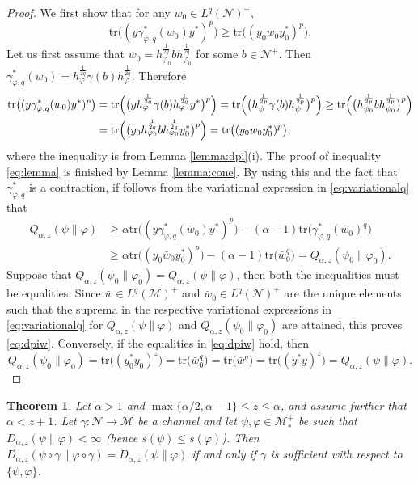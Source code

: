 \documentclass[12pt]{article}
\newtheorem{theorem}{Theorem}[section]
\theoremstyle{definition}
\theoremstyle{remark}
\numberwithin{equation}{section}
\def\Me{\mathcal M}
\def\Ne{\mathcal N}
\def\Tr{\mathrm{tr}}
\def\ffi{\varphi}
\begin{document}
\begin{proof} We first show that  for any $w_0\in L^q(\Ne)^+$,
\begin{equation}\label{eq:lemma}
\Tr\bigl((y\gamma^*_{\ffi,q}(w_0)y^*)^p\bigr)\ge
\Tr\bigl((y_0w_0y_0^*)^p\bigr).
\end{equation}
Let us first assume that
$w_0=h_{\varphi_0}^{\frac1{2q}}bh_{\varphi_0}^{\frac1{2q}}$ for some $b\in \Ne^+$. Then 
$\gamma^*_{\varphi,q}(w_0)=h_{\varphi}^{\frac1{2q}}\gamma(b)h_{\varphi}^{\frac1{2q}}$.
Therefore
\begin{align*}
\Tr\bigl((y\gamma^*_{\varphi,q}(w_0)y^*)^p\bigr)
&=\Tr\Bigl(\bigl(yh_{\varphi}^{\frac1{2q}}\gamma(b)h_{\varphi}^{\frac1{2q}}y^*\bigr)^p\Bigr)=
\Tr\Bigl(\bigl(h_\psi^{\frac1{2p}}\gamma(b)h_\psi^{\frac1{2p}}\bigr)^p\Bigr)\ge
\Tr\Bigl(\bigl(h_{\psi_0}^{\frac1{2p}}bh_{\psi_0}^{\frac1{2p}}\bigr)^p\Bigr)\\
&=\Tr\Bigl(\bigl(y_0h_{\varphi_0}^{\frac1{2q}}bh_{\varphi_0}^{\frac1{2q}}y_0^*\bigr)^p\Bigr)
=\Tr\bigl((y_0w_0y_0^*)^p\bigr),
\end{align*}
where the inequality is from Lemma \ref{lemma:dpi}(i). The proof of inequality
\eqref{eq:lemma} is  finished  by Lemma \ref{lemma:cone}.
By using this and the fact that $\gamma^*_{\ffi,q}$ is a contraction, if follows from the variational
expression in \eqref{eq:variationalq} that
\begin{align*}
Q_{\alpha,z}(\psi\|\varphi)
&\ge \alpha\Tr\bigl((y\gamma^*_{\varphi,q}(\bar w_0)y^*)^p\bigr)-
(\alpha-1)\Tr\bigl(\gamma^*_{\varphi,q}(\bar w_0)^q\bigr)\\
&\ge \alpha\Tr\bigr((y_0\bar w_0 y_0^*)^p\bigr)-(\alpha-1)\Tr\bigl(\bar
w_0^q\bigr)=Q_{\alpha,z}(\psi_0\|\varphi_0).
\end{align*}
Suppose that $Q_{\alpha,z}(\psi_0\|\varphi_0)=Q_{\alpha,z}(\psi\|\varphi)$, then both the
inequalities must be equalities. Since $\bar
w\in L^q(\Me)^+$ and $\bar w_0\in L^q(\Ne)^+$ are the unique elements such that the suprema
in the respective variational expressions in \eqref{eq:variationalq} for
$Q_{\alpha,z}(\psi\|\varphi)$ and $Q_{\alpha,z}(\psi_0\|\varphi_0)$ are attained, this proves
\eqref{eq:dpiw}. Conversely, if the equalities in \eqref{eq:dpiw} hold, then
\[
Q_{\alpha,z}(\psi_0\|\ffi_0)=\Tr\bigl((y_0^*y_0)^z\bigr)=\Tr\bigl(\bar w_0^q\bigr)
=\Tr\bigl(\bar w^q\bigr)=\Tr\bigl((y^*y)^z\bigr)=Q_{\alpha,z}(\psi\|\ffi).
\]
\end{proof}


\begin{theorem}\label{thm:suffge1}
{Let $\alpha>1$ and $\max\{\alpha/2,\alpha-1\}\le z\le\alpha$, and assume further that
$\alpha<z+1$.} Let $\gamma:\Ne\to \Me$ be a channel and let $\psi,\varphi\in \Me_*^+$ be such that 
$D_{\alpha,z}(\psi\|\varphi)<\infty$ (hence $s(\psi)\le s(\ffi)$). Then
$D_{\alpha,z}(\psi\circ\gamma\|\ffi\circ\gamma)=D_{\alpha,z}(\psi\|\varphi)$ if and only if
$\gamma$ is sufficient with respect to $\{\psi,\ffi\}$.
\end{theorem}
\end{document}
